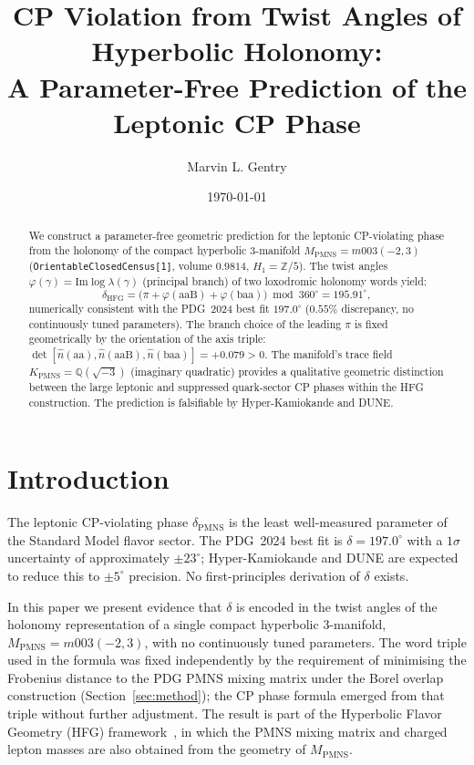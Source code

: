 \documentclass[11pt,a4paper]{article}
\theoremstyle{definition}
\theoremstyle{remark}
\newcommand{\MPMNS}{M_{\mathrm{PMNS}}}
\newcommand{\KPMNS}{K_{\mathrm{PMNS}}}
\newcommand{\QQ}{\mathbb{Q}}
\newcommand{\Zfive}{\mathbb{Z}/5}
\begin{document}
\title{CP Violation from Twist Angles of Hyperbolic Holonomy:\\
A Parameter-Free Prediction of the Leptonic CP Phase}

\author[1]{Marvin L. Gentry}
\date{\today}

\begin{abstract}
We construct a parameter-free geometric prediction for the leptonic
CP-violating phase from the holonomy of the compact hyperbolic
3-manifold $\MPMNS = m003(-2,3)$ (\texttt{OrientableClosedCensus[1]},
volume $0.9814$, $H_1=\Zfive$).
The twist angles $\varphi(\gamma)=\mathrm{Im}\log\lambda(\gamma)$
(principal branch) of two loxodromic holonomy words yield:
\[
  \delta_{\mathrm{HFG}}
  = \bigl(\pi + \varphi(\mathrm{aaB}) + \varphi(\mathrm{baa})\bigr)
    \bmod 360^\circ
  = 195.91^\circ,
\]
numerically consistent with the PDG~2024 best fit $197.0^\circ$
($0.55\%$ discrepancy, no continuously tuned parameters).
The branch choice of the leading $\pi$ is fixed geometrically by
the orientation of the axis triple:
$\det[\hat{n}(\mathrm{aa}),\hat{n}(\mathrm{aaB}),
\hat{n}(\mathrm{baa})]=+0.079>0$.
The manifold's trace field $\KPMNS=\QQ(\sqrt{-3})$
(imaginary quadratic) provides a qualitative geometric distinction
between the large leptonic and suppressed quark-sector CP phases
within the HFG construction.
The prediction is falsifiable by Hyper-Kamiokande and DUNE.
\end{abstract}

\maketitle

\section{Introduction}
\label{sec:intro}

The leptonic CP-violating phase $\delta_{\mathrm{PMNS}}$ is the
least well-measured parameter of the Standard Model flavor sector.
The PDG~2024 best fit is $\delta=197.0^\circ$ with a $1\sigma$
uncertainty of approximately $\pm23^\circ$; Hyper-Kamiokande and
DUNE are expected to reduce this to $\pm5^\circ$ precision.
No first-principles derivation of $\delta$ exists.

In this paper we present evidence that $\delta$ is encoded in the
twist angles of the holonomy representation of a single compact
hyperbolic 3-manifold, $\MPMNS=m003(-2,3)$, with no continuously
tuned parameters.
The word triple used in the formula was fixed independently by the
requirement of minimising the Frobenius distance to the PDG PMNS
mixing matrix under the Borel overlap construction
(Section~\ref{sec:method}); the CP phase formula emerged from that
triple without further adjustment.
The result is part of the Hyperbolic Flavor Geometry (HFG)
framework~\cite{Gentry:Unified}, in which the PMNS mixing matrix
and charged lepton masses are also obtained from the geometry of
$\MPMNS$.
\end{document}
